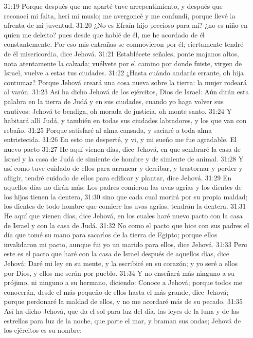 31:19 Porque después que me aparté tuve arrepentimiento, y después que reconocí mi falta, herí mi muslo; me avergoncé y me confundí, porque llevé la afrenta de mi juventud.  
31:20 ¿No es Efraín hijo precioso para mí? ¿no es niño en quien me deleito? pues desde que hablé de él, me he acordado de él constantemente. Por eso mis entrañas se conmovieron por él; ciertamente tendré de él misericordia, dice Jehová.  
31:21 Establécete señales, ponte majanos altos, nota atentamente la calzada; vuélvete por el camino por donde fuiste, virgen de Israel, vuelve a estas tus ciudades.  
31:22 ¿Hasta cuándo andarás errante, oh hija contumaz? Porque Jehová creará una cosa nueva sobre la tierra: la mujer rodeará al varón.  
31:23 Así ha dicho Jehová de los ejércitos, Dios de Israel: Aún dirán esta palabra en la tierra de Judá y en sus ciudades, cuando yo haga volver sus cautivos: Jehová te bendiga, oh morada de justicia, oh monte santo.  
31:24 Y habitará allí Judá, y también en todas sus ciudades labradores, y los que van con rebaño.  
31:25 Porque satisfaré al alma cansada, y saciaré a toda alma entristecida.  
31:26 En esto me desperté, y vi, y mi sueño me fue agradable.  
El nuevo pacto  
31:27 He aquí vienen días, dice Jehová, en que sembraré la casa de Israel y la casa de Judá de simiente de hombre y de simiente de animal.  
31:28 Y así como tuve cuidado de ellos para arrancar y derribar, y trastornar y perder y afligir, tendré cuidado de ellos para edificar y plantar, dice Jehová.  
31:29 En aquellos días no dirán más: Los padres comieron las uvas agrias y los dientes de los hijos tienen la dentera, 
31:30 sino que cada cual morirá por su propia maldad; los dientes de todo hombre que comiere las uvas agrias, tendrán la dentera.  
31:31 He aquí que vienen días, dice Jehová, en los cuales haré nuevo pacto con la casa de Israel y con la casa de Judá.  
31:32 No como el pacto que hice con sus padres el día que tomé su mano para sacarlos de la tierra de Egipto; porque ellos invalidaron mi pacto, aunque fui yo un marido para ellos, dice Jehová.  
31:33 Pero este es el pacto que haré con la casa de Israel después de aquellos días, dice Jehová: Daré mi ley en su mente, y la escribiré en su corazón; y yo seré a ellos por Dios, y ellos me serán por pueblo.  
31:34 Y no enseñará más ninguno a su prójimo, ni ninguno a su hermano, diciendo: Conoce a Jehová; porque todos me conocerán, desde el más pequeño de ellos hasta el más grande, dice Jehová; porque perdonaré la maldad de ellos, y no me acordaré más de su pecado. 
31:35 Así ha dicho Jehová, que da el sol para luz del día, las leyes de la luna y de las estrellas para luz de la noche, que parte el mar, y braman sus ondas; Jehová de los ejércitos es su nombre:  
